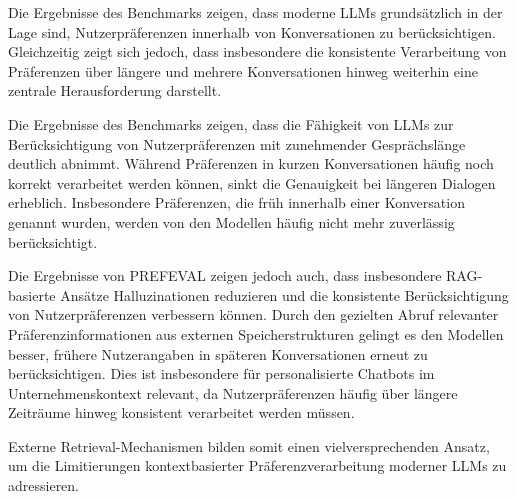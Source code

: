 Die Ergebnisse des Benchmarks zeigen, dass moderne LLMs grundsätzlich in der Lage sind, Nutzerpräferenzen innerhalb von Konversationen zu berücksichtigen. Gleichzeitig zeigt sich jedoch, dass insbesondere die konsistente Verarbeitung von Präferenzen über längere und mehrere Konversationen hinweg weiterhin eine zentrale Herausforderung darstellt. 

Die Ergebnisse des Benchmarks zeigen, dass die Fähigkeit von LLMs zur Berücksichtigung von Nutzerpräferenzen mit zunehmender Gesprächslänge deutlich abnimmt. Während Präferenzen in kurzen Konversationen häufig noch korrekt verarbeitet werden können, sinkt die Genauigkeit bei längeren Dialogen erheblich. Insbesondere Präferenzen, die früh innerhalb einer Konversation genannt wurden, werden von den Modellen häufig nicht mehr zuverlässig berücksichtigt.


Die Ergebnisse von PREFEVAL zeigen jedoch auch, dass insbesondere RAG-basierte Ansätze Halluzinationen reduzieren und die konsistente Berücksichtigung von Nutzerpräferenzen verbessern können. Durch den gezielten Abruf relevanter Präferenzinformationen aus externen Speicherstrukturen gelingt es den Modellen besser, frühere Nutzerangaben in späteren Konversationen erneut zu berücksichtigen. Dies ist insbesondere für personalisierte Chatbots im Unternehmenskontext relevant, da Nutzerpräferenzen häufig über längere Zeiträume hinweg konsistent verarbeitet werden müssen.

Externe Retrieval-Mechanismen bilden somit einen vielversprechenden Ansatz, um die Limitierungen kontextbasierter Präferenzverarbeitung moderner LLMs zu adressieren.